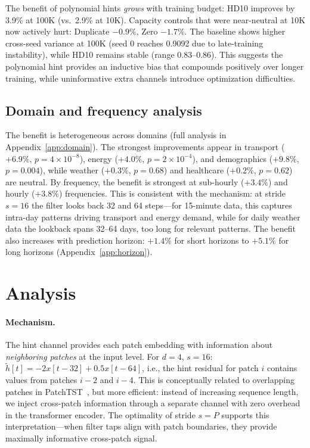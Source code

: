 \documentclass{article}
\begin{document}
The benefit of polynomial hints \emph{grows} with training budget: HD10 improves by 3.9\% at 100K (vs.\ 2.9\% at 10K). Capacity controls that were near-neutral at 10K now actively hurt: Duplicate $-0.9\%$, Zero $-1.7\%$. The baseline shows higher cross-seed variance at 100K (seed 0 reaches 0.9092 due to late-training instability), while HD10 remains stable (range 0.83--0.86). This suggests the polynomial hint provides an inductive bias that compounds positively over longer training, while uninformative extra channels introduce optimization difficulties.

\subsection{Domain and frequency analysis}

The benefit is heterogeneous across domains (full analysis in Appendix~\ref{app:domain}). The strongest improvements appear in transport ($+6.9\%$, $p = 4 \times 10^{-8}$), energy ($+4.0\%$, $p = 2 \times 10^{-4}$), and demographics ($+9.8\%$, $p = 0.004$), while weather ($+0.3\%$, $p = 0.68$) and healthcare ($+0.2\%$, $p = 0.62$) are neutral. By frequency, the benefit is strongest at sub-hourly ($+3.4\%$) and hourly ($+3.8\%$) frequencies. This is consistent with the mechanism: at stride $s{=}16$ the filter looks back 32 and 64 steps---for 15-minute data, this captures intra-day patterns driving transport and energy demand, while for daily weather data the lookback spans 32--64 days, too long for relevant patterns. The benefit also increases with prediction horizon: $+1.4\%$ for short horizons to $+5.1\%$ for long horizons (Appendix~\ref{app:horizon}).

\section{Analysis}

\paragraph{Mechanism.} The hint channel provides each patch embedding with information about \emph{neighboring patches} at the input level. For $d{=}4$, $s{=}16$: $\tilde{h}[t] = -2 x[t{-}32] + 0.5 x[t{-}64]$, i.e., the hint residual for patch $i$ contains values from patches $i{-}2$ and $i{-}4$. This is conceptually related to overlapping patches in PatchTST~\citep{nie2023patchtst}, but more efficient: instead of increasing sequence length, we inject cross-patch information through a separate channel with zero overhead in the transformer encoder. The optimality of stride $s = P$ supports this interpretation---when filter taps align with patch boundaries, they provide maximally informative cross-patch signal.
\end{document}
